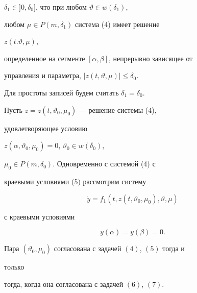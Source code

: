 $\delta_1\in]0,\delta_0]$, что при любом $\vartheta\in w(\delta_1)$, 


любом $\mu\in P(m,\delta_1)$ система (4) имеет решение 


$z(t.\vartheta,\mu)$, 


определенное на сегменте $[\alpha,\beta]$, непрерывно зависящее от 


управления и параметра, $|z(t,\vartheta,\mu)|\le\delta_0$. 


Для простоты записей будем считать $\delta_1=\delta_0$. 


 


Пусть $z=z(t,\vartheta_0,\mu_0)$ --- решение системы (4), 


удовлетворяющее условию 


$z(\alpha,\vartheta_0,\mu_0)=0$, $\vartheta_0\in w(\delta_0)$, 


$\mu_0\in P(m,\delta_0)$. Одновременно с системой (4) с 


краевыми условиями (5) рассмотрим систему 


\begin{equation} 


\Dot y=f_1(t,z(t,\vartheta_0,\mu_0),\vartheta,\mu) 


\end{equation} 


с краевыми условиями 


\begin{equation} 


y(\alpha)=y(\beta)=0. 


\end{equation} 


 


\begin{thm} 


Пара $(\vartheta_0,\mu_0)$ согласована с задачей $(4)$, $(5)$ тогда и 


только 


тогда, когда она согласована с задачей $(6)$, $(7)$. 


\end{thm} 


 


